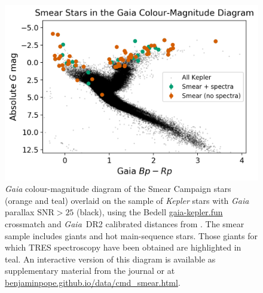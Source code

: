 \documentclass[a4paper,fleqn,usenatbib]{mnras}
\newcommand{\kepler}{\textit{Kepler}\xspace}
\newcommand{\gaia}{\textit{Gaia}\xspace}
\begin{document}
\begin{figure}
\noindent\includegraphics[width=15cm,keepaspectratio]{gaia_kepler_hr.png}

\caption{\label{hrdiagram}
\gaia colour-magnitude diagram of the Smear Campaign stars (orange and teal) overlaid on the sample of \kepler stars with \gaia parallax $\text{SNR} > 25$ (black), using the Bedell \url{gaia-kepler.fun} crossmatch and \gaia~DR2 calibrated distances from \citet{gaiadists}. The smear sample includes giants and hot main-sequence stars. Those giants for which TRES spectroscopy have been obtained are highlighted in teal. An interactive version of this diagram is available as supplementary material from the journal or at \url{benjaminpope.github.io/data/cmd_smear.html}.}
\end{figure}

\end{document}
